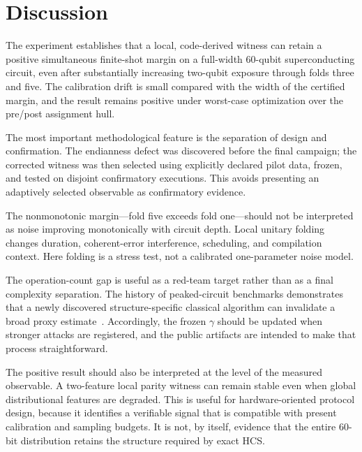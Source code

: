 \documentclass[11pt]{article}
\begin{document}
\section{Discussion}
The experiment establishes that a local, code-derived witness can retain a positive simultaneous finite-shot margin on a full-width 60-qubit superconducting circuit, even after substantially increasing two-qubit exposure through folds three and five. The calibration drift is small compared with the width of the certified margin, and the result remains positive under worst-case optimization over the pre/post assignment hull.

The most important methodological feature is the separation of design and confirmation. The endianness defect was discovered before the final campaign; the corrected witness was then selected using explicitly declared pilot data, frozen, and tested on disjoint confirmatory executions. This avoids presenting an adaptively selected observable as confirmatory evidence.

The nonmonotonic margin---fold five exceeds fold one---should not be interpreted as noise improving monotonically with circuit depth. Local unitary folding changes duration, coherent-error interference, scheduling, and compilation context. Here folding is a stress test, not a calibrated one-parameter noise model.

The operation-count gap is useful as a red-team target rather than as a final complexity separation. The history of peaked-circuit benchmarks demonstrates that a newly discovered structure-specific classical algorithm can invalidate a broad proxy estimate~\cite{kremer2026peaked}. Accordingly, the frozen $\gamma$ should be updated when stronger attacks are registered, and the public artifacts are intended to make that process straightforward.

The positive result should also be interpreted at the level of the measured observable. A two-feature local parity witness can remain stable even when global distributional features are degraded. This is useful for hardware-oriented protocol design, because it identifies a verifiable signal that is compatible with present calibration and sampling budgets. It is not, by itself, evidence that the entire 60-bit distribution retains the structure required by exact HCS.
\end{document}

